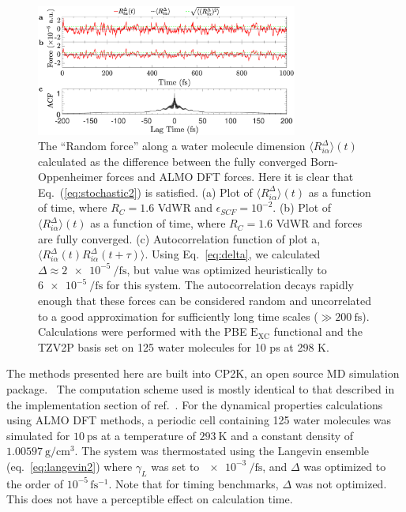 \documentclass[10pt,aps,prl,twocolumn,amsmath,amssymb,superscriptaddress,longbibliography]{revtex4-1}
\begin{document}
\begin{figure}
\includegraphics[trim={0.6cm 0.7cm 0.7cm 0.3cm},clip,width=8.6cm]{DeltaForceComparison_with_ACF.eps}
\caption{\label{fig:randomforce}The ``Random force'' along a water molecule dimension $\langle R^{\Delta}_{i\alpha} \rangle (t)$ calculated as the difference between the fully converged Born-Oppenheimer forces and ALMO DFT forces. Here it is clear that Eq.\ (\ref{eq:stochastic2}) is satisfied. 
(a) Plot of $\langle R^{\Delta}_{i\alpha} \rangle (t)$ as a function of time, where $R_{C} = 1.6$ VdWR and $\epsilon_{SCF} = 10^{-2}$.
(b) Plot of $\langle R^{\Delta}_{i\alpha} \rangle (t)$ as a function of time, where $R_{C} = 1.6$ VdWR and forces are fully converged.
(c) Autocorrelation function of plot a, $\langle R^{\Delta}_{i\alpha} (t) R^{\Delta}_{i\alpha} (t+\tau) \rangle $.
Using Eq.\ \ref{eq:delta}, we calculated $\Delta \approx \SI{2e-5}{\per\fs}$, but value was optimized heuristically to $\SI{6e-5}{\per\fs}$ for this system.
The autocorrelation decays rapidly enough that these forces can be considered random and uncorrelated to a good approximation for sufficiently long time scales ($\gg\SI{200}{\fs}$). 
Calculations were performed with the PBE $\mathrm{E_{XC}}$ functional and the TZV2P basis set on 125 water molecules for 10 ps at 298 K.}
\end{figure}


The methods presented here are built into CP2K, an open source MD simulation package.~\cite{www:cp2k} 
The computation scheme used is mostly identical to that described in the implementation section of ref.\ . 
For the dynamical properties calculations using ALMO DFT methods, a periodic cell containing 125 water molecules was simulated for $\SI{10}{\ps}$ at a temperature of $\SI{293}{\K}$ and a constant density of $\SI{1.00597}{\g\per\cm^{3}}$. 
The system was thermostated using the Langevin ensemble (eq.\ \ref{eq:langevin2}) where $\gamma_L$ was set to $\SI{e-3}{\per\fs}$, and $\Delta$ was optimized to the order of $10^{-5}\, \mathrm{fs^{-1}}$. 
Note that for timing benchmarks, $\Delta$ was not optimized. 
This does not have a perceptible effect on calculation time.
\end{document}
